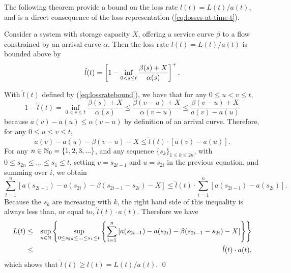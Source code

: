 

The following theorem provide a bound on the loss rate $l(t) = L(t)/a(t)$, and is a direct
consequence of the loss representation (\ref{eq:losses-at-time-t}).

\begin{theorem}
Consider a system with storage capacity $X$, offering a service curve $\beta$ to a flow constrained by an arrival curve $\alpha$. Then the loss rate $l(t) = L(t)/a(t)$ is bounded above by
\begin{equation}
\mylabel{eq:lossratebound}
\hat{l}(t) = \left[ 1 - \inf_{0 < s \leq t} \frac{\beta(s) + X}{\alpha(s)} \right]^{+} .
\end{equation}
\end{theorem}

\pr With $\hat{l}(t)$ defined by (\ref{eq:lossratebound}), we have that for any $0 \leq u < v \leq t$,
$$ 1 - \hat{l}(t) = \inf_{0 < s \leq t} \frac{\beta(s) + X}{\alpha(s)}
                  \leq  \frac{\beta(v-u) + X}{\alpha(v-u)}
                  \leq  \frac{\beta(v-u) + X}{a(v)-a(u)} $$
because $a(v)-a(u) \leq \alpha(v-u)$ by definition of an arrival curve.
Therefore, for any $0 \leq u \leq v \leq t$,
$$ a(v)-a(u)- \beta(v-u) - X \leq  \hat{l}(t) \cdot [a(v) - a(u)]. $$
For any $n \in \mathbb{N}_0=\{1,2,3,...\}$, and
any sequence $\{ s_k \}_{1 \leq k \leq 2n}$, with $0 \leq s_{2n}
\leq \ldots \leq s_1 \leq t$, setting $v = s_{2i-1}$ and $u =
s_{2i}$ in the previous equation, and summing over $i$, we obtain
$$ \sum_{i=1}^{n} \left[ a(s_{2i-1})-a(s_{2i})- \beta(s_{2i-1}-s_{2i}) - X \right] \leq  \hat{l}(t) \cdot  \sum_{i=1}^{n} \left[ a(s_{2i-1}) - a(s_{2i}) \right]. $$
Because the $s_k$ are increasing with $k$, the right hand side of this inequality
is always less than, or equal to, $\hat{l}(t) \cdot a(t)$.
Therefore we have
\begin{eqnarray*}
 L(t) & \leq & \sup_{n \in \mathbb{N}}  \left\{ \sup_{0 \leq s_{2n} \leq \ldots \leq
s_1 \leq t} \left\{ \sum_{i=1}^n \left[ a(s_{2i-1}) - a(s_{2i}) -
\beta(s_{2i-1}-s_{2i}) - X \right] \right\} \right\} \\
& \leq & \hat{l}(t) \cdot a(t),
\end{eqnarray*}
 which shows that $\hat{l}(t) \geq l(t) = L(t)/a(t)$.
\qed

